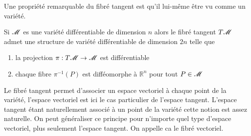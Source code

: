 \documentclass[a4paper,11pt]{report}
\begin{document}
                Une propriété remarquable du fibré tangent est qu'il lui-même être vu comme un variété.
                
                \begin{prop}\begin{leftbar}
                    Si $\mathscr{M}$ es une variété différentiable de dimension $n$ alors le fibré tangent $T\mathscr{M}$ admet une structure de variété différentiable de dimension $2n$ telle que
                    \begin{enumerate}[label = \textit{\roman*)}]
                        \item la projection $\pi:T\mathscr{M}\to\mathscr{M}$ est différentiable
                        \item chaque fibre $\pi^{-1}(P)$ est difféomorphe à $\mathbb{R}^n$ pour tout $P\in\mathscr{M}$
                    \end{enumerate}
                \end{leftbar}\end{prop}
                
                Le fibré tangent permet d'associer un espace vectoriel à chaque point de la variété, l'espace vectoriel est ici le cas particulier de l'espace tangent. L'espace tangent étant naturellement associé à un point de la variété cette notion est assez naturelle. On peut généraliser ce principe pour n'importe quel type d'espace vectoriel, plus seulement l'espace tangent. On appelle ca le fibré vectoriel.
                
\end{document}
